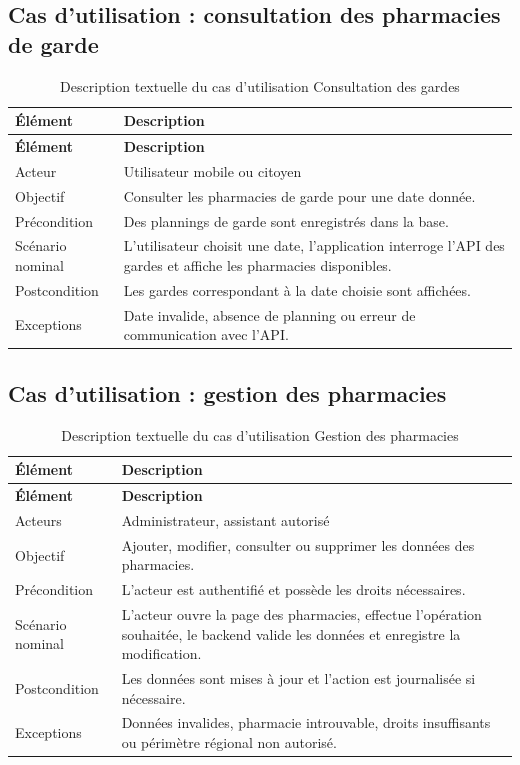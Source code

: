 \subsection{Cas d'utilisation : consultation des pharmacies de garde}

\begin{longtable}{L{4cm}L{10cm}}
    \caption{Description textuelle du cas d'utilisation Consultation des gardes}\\
    \toprule
    \textbf{Élément} & \textbf{Description} \\
    \midrule
    \endfirsthead
    \toprule
    \textbf{Élément} & \textbf{Description} \\
    \midrule
    \endhead
    Acteur & Utilisateur mobile ou citoyen \\
    Objectif & Consulter les pharmacies de garde pour une date donnée. \\
    Précondition & Des plannings de garde sont enregistrés dans la base. \\
    Scénario nominal & L'utilisateur choisit une date, l'application interroge l'API des gardes et affiche les pharmacies disponibles. \\
    Postcondition & Les gardes correspondant à la date choisie sont affichées. \\
    Exceptions & Date invalide, absence de planning ou erreur de communication avec l'API. \\
    \bottomrule
\end{longtable}

\subsection{Cas d'utilisation : gestion des pharmacies}

\begin{longtable}{L{4cm}L{10cm}}
    \caption{Description textuelle du cas d'utilisation Gestion des pharmacies}\\
    \toprule
    \textbf{Élément} & \textbf{Description} \\
    \midrule
    \endfirsthead
    \toprule
    \textbf{Élément} & \textbf{Description} \\
    \midrule
    \endhead
    Acteurs & Administrateur, assistant autorisé \\
    Objectif & Ajouter, modifier, consulter ou supprimer les données des pharmacies. \\
    Précondition & L'acteur est authentifié et possède les droits nécessaires. \\
    Scénario nominal & L'acteur ouvre la page des pharmacies, effectue l'opération souhaitée, le backend valide les données et enregistre la modification. \\
    Postcondition & Les données sont mises à jour et l'action est journalisée si nécessaire. \\
    Exceptions & Données invalides, pharmacie introuvable, droits insuffisants ou périmètre régional non autorisé. \\
    \bottomrule
\end{longtable}

